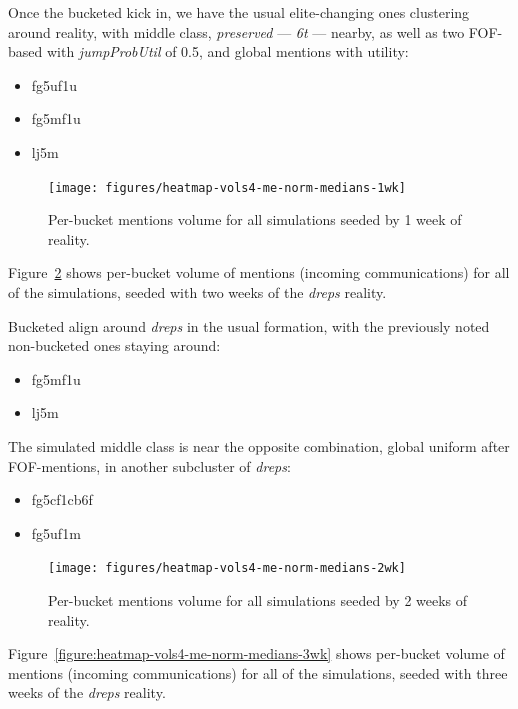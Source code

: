 \documentclass[10pt,oneside]{memoir}
\begin{document}
Once the bucketed kick in, we have the usual elite-changing ones clustering around reality, with middle class, {\itshape preserved} --- {\itshape 6t} --- nearby, as well as two FOF-based with {\itshape jumpProbUtil} of 0.5, and global mentions with utility:


\begin{itemize}


\item fg5uf1u

\item fg5mf1u

\item lj5m
\end{itemize}


\begin{figure}
\begin{center}
    \texttt{[image: figures/heatmap-vols4-me-norm-medians-1wk]}
    \caption{Per-bucket mentions volume for all simulations seeded by 1 week of reality.}
    \label{figure:heatmap-vols4-me-norm-medians-1wk}
\end{center}
\end{figure}
Figure~\ref{figure:heatmap-vols4-me-norm-medians-2wk} shows per-bucket volume of mentions (incoming communications) for all of the simulations, seeded with two weeks of the {\itshape dreps} reality.


Bucketed align around {\itshape dreps} in the usual formation, with the previously noted non-bucketed ones staying around:


\begin{itemize}


\item fg5mf1u

\item lj5m
\end{itemize}

The simulated middle class is near the opposite combination, global uniform after FOF-mentions, in another subcluster of {\itshape dreps}:


\begin{itemize}


\item fg5cf1cb6f

\item fg5uf1m
\end{itemize}


\begin{figure}
\begin{center}
    \texttt{[image: figures/heatmap-vols4-me-norm-medians-2wk]}
    \caption{Per-bucket mentions volume for all simulations seeded by 2 weeks of reality.}
    \label{figure:heatmap-vols4-me-norm-medians-2wk}
\end{center}
\end{figure}
Figure~\ref{figure:heatmap-vols4-me-norm-medians-3wk} shows per-bucket volume of mentions (incoming communications) for all of the simulations, seeded with three weeks of the {\itshape dreps} reality.
\end{document}
